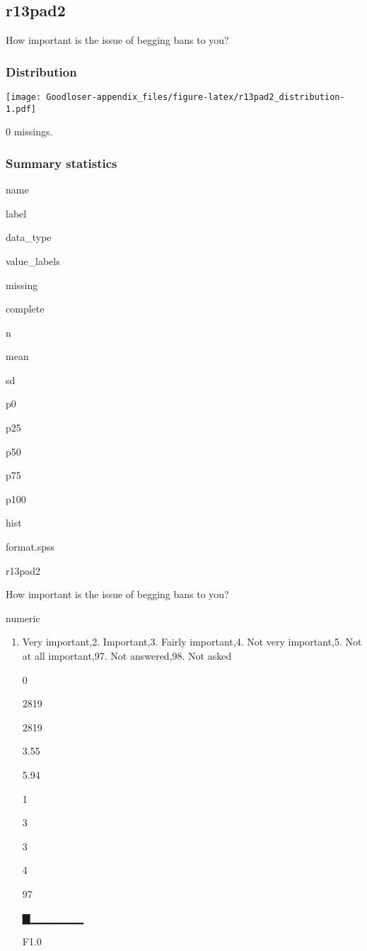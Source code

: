 \documentclass[]{book}
\providecommand{\tightlist}{%
  \setlength{\itemsep}{0pt}\setlength{\parskip}{0pt}}
\begin{document}
\subsection{r13pad2}\label{r13pad2}

How important is the issue of begging bans to you?

\subsubsection{Distribution}\label{r13pad2_distribution}

\texttt{[image: Goodloser-appendix\_files/figure-latex/r13pad2\_distribution-1.pdf]}

0 missings.

\subsubsection{Summary statistics}\label{r13pad2_summary}

name

label

data\_type

value\_labels

missing

complete

n

mean

sd

p0

p25

p50

p75

p100

hist

format.spss

r13pad2

How important is the issue of begging bans to you?

numeric

\begin{enumerate}
\def\labelenumi{\arabic{enumi}.}
\tightlist
\item
  Very important,2. Important,3. Fairly important,4. Not very
  important,5. Not at all important,97. Not answered,98. Not asked

  0

  2819

  2819

  3.55

  5.94

  1

  3

  3

  4

  97

  ▇▁▁▁▁▁▁▁

  F1.0
\end{enumerate}
\end{document}

